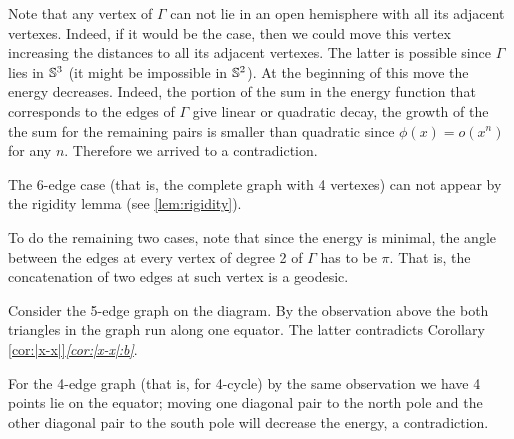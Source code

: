 Note that any vertex of $\Gamma$ can not lie in an open hemisphere with all its adjacent vertexes. 
Indeed, if it would be the case, then we could move this vertex increasing the distances to all its adjacent vertexes.
The latter is possible since $\Gamma$ lies in $\mathbb{S}^3$ (it might be impossible in $\mathbb{S}^2$).
At the beginning of this move the energy decreases.
Indeed, the portion of the sum in the energy function that corresponds to the edges of $\Gamma$ give linear or quadratic decay, 
the growth of the the sum for the remaining pairs is smaller than quadratic since $\phi(x)=o(x^n)$ for any $n$.
Therefore we arrived to a contradiction.

The 6-edge case (that is, the complete graph with 4 vertexes) can not appear by the rigidity lemma (see \ref{lem:rigidity}).

To do the remaining two cases, note that since the energy is minimal, the angle between the edges at every vertex of degree 2 of $\Gamma$ has to be $\pi$. 
That is, the concatenation of two edges at such vertex is a geodesic.

Consider the 5-edge graph on the diagram.
By the observation above the both triangles in the graph run along one equator.
The latter contradicts Corollary \ref{cor:|x-x|}\textit{\ref{cor:|x-x|:b}}.

For the 4-edge graph (that is, for 4-cycle)
by the same observation we have 4 points lie on the equator; 
moving one diagonal pair to the north pole 
and the other diagonal pair to the south pole will decrease the energy, a contradiction.
\qeds
